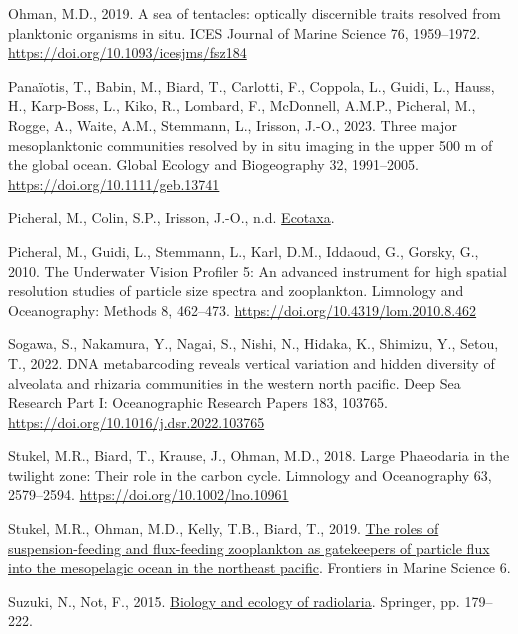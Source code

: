 \documentclass[
]{article}
\newlength{\cslhangindent}
\newlength{\cslentryspacingunit} %
\newenvironment{CSLReferences}[2] %
 {%
  \setlength{\parindent}{0pt}
  \ifodd #1
  \let\oldpar\par
  \def\par{\hangindent=\cslhangindent\oldpar}
  \fi
  \setlength{\parskip}{#2\cslentryspacingunit}
 }%
 {}
\begin{document}
\begin{CSLReferences}{1}{0}
\leavevmode{}%
Ohman, M.D., 2019. A sea of tentacles: optically discernible traits
resolved from planktonic organisms in situ. ICES Journal of Marine
Science 76, 1959--1972. \url{https://doi.org/10.1093/icesjms/fsz184}

\leavevmode{}%
Panaïotis, T., Babin, M., Biard, T., Carlotti, F., Coppola, L., Guidi,
L., Hauss, H., Karp-Boss, L., Kiko, R., Lombard, F., McDonnell, A.M.P.,
Picheral, M., Rogge, A., Waite, A.M., Stemmann, L., Irisson, J.-O.,
2023. Three major mesoplanktonic communities resolved by in situ imaging
in the upper 500 m of the global ocean. Global Ecology and Biogeography
32, 1991--2005. \url{https://doi.org/10.1111/geb.13741}

\leavevmode{}%
Picheral, M., Colin, S.P., Irisson, J.-O., n.d.
\href{https://ecotaxa.obs-vlfr.fr/}{Ecotaxa}.

\leavevmode{}%
Picheral, M., Guidi, L., Stemmann, L., Karl, D.M., Iddaoud, G., Gorsky,
G., 2010. The Underwater Vision Profiler 5: An advanced instrument for
high spatial resolution studies of particle size spectra and
zooplankton. Limnology and Oceanography: Methods 8, 462--473.
\url{https://doi.org/10.4319/lom.2010.8.462}

\leavevmode{}%
Sogawa, S., Nakamura, Y., Nagai, S., Nishi, N., Hidaka, K., Shimizu, Y.,
Setou, T., 2022. DNA metabarcoding reveals vertical variation and hidden
diversity of alveolata and rhizaria communities in the western north
pacific. Deep Sea Research Part I: Oceanographic Research Papers 183,
103765. \url{https://doi.org/10.1016/j.dsr.2022.103765}

\leavevmode{}%
Stukel, M.R., Biard, T., Krause, J., Ohman, M.D., 2018. Large Phaeodaria
in the twilight zone: Their role in the carbon cycle. Limnology and
Oceanography 63, 2579--2594. \url{https://doi.org/10.1002/lno.10961}

\leavevmode{}%
Stukel, M.R., Ohman, M.D., Kelly, T.B., Biard, T., 2019.
\href{https://www.frontiersin.org/articles/10.3389/fmars.2019.00397}{The
roles of suspension-feeding and flux-feeding zooplankton as gatekeepers
of particle flux into the mesopelagic ocean in the northeast pacific}.
Frontiers in Marine Science 6.

\leavevmode{}%
Suzuki, N., Not, F., 2015.
\href{https://link.springer.com/chapter/10.1007/978-4-431-55130-0_8}{Biology
and ecology of radiolaria}. Springer, pp. 179--222.


\end{CSLReferences}
\end{document}
